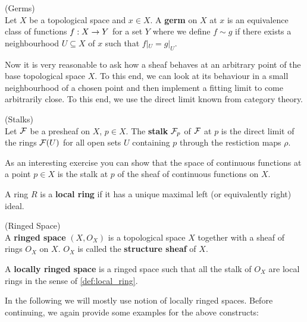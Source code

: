 \begin{definition} (Germs)\\
  Let $X$ be a topological space and $x \in X$. A \textbf{germ} on $X$ at $x$ is an equivalence class of functions $f:X \rightarrow Y$ for a set $Y$ where we define $f\sim g$ if there exists a neighbourhood $U\subseteq X$ of $x$ such that $f|_U = g|_U$.
\end{definition}

Now it is very reasonable to ask how a sheaf behaves at an arbitrary point of the base topological space $X$. To this end, we can look at its behaviour in a small neighbourhood of a chosen point and then implement a fitting limit to come arbitrarily close. To this end, we use the direct limit known from category theory.

\begin{definition} (Stalks)\\
  Let ${\mathcal{F}}$ be a presheaf on $X$, $p \in X$. The \textbf{stalk} ${\mathcal{F}}_p$ of ${\mathcal{F}}$ at $p$ is the direct limit of the rings ${\mathcal{F}}(U)$ for all open sets $U$ containing $p$ through the restiction maps $\rho$.
\end{definition}


\begin{ex}
  As an interesting exercise you can show that the space of continuous functions at a point $p \in X$ is the stalk at $p$ of the sheaf of continuous functions on $X$.
\end{ex}

\begin{definition}
\label{def:local_ring}
  A ring $R$ is a \textbf{local ring} if it has a unique maximal left (or equivalently right) ideal.
\end{definition}

\begin{definition} (Ringed Space)\\
  A \textbf{ringed space} $(X, O_X)$ is a topological space $X$ together with a sheaf of rings $O_X$ on $X$. $O_X$ is called the \textbf{structure sheaf} of $X$.
\end{definition}

\begin{definition}
  A \textbf{locally ringed space} is a ringed space such that all the stalk of $O_X$ are local rings in the sense of \ref{def:local_ring}.
\end{definition}

In the following we will mostly use notion of locally ringed spaces. Before continuing, we again provide some examples for the above constructs:

